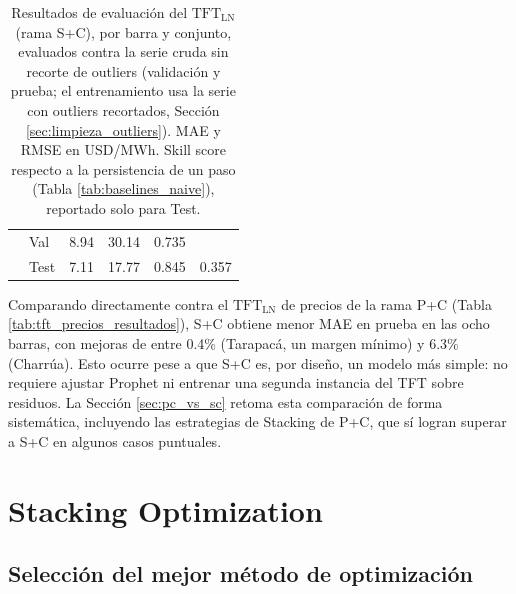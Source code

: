 \begin{table}[htbp]
\begin{tabular}{llrrrr}
            & Val   & 8.94 & 30.14 & 0.735 & \\
            & Test  & 7.11 & 17.77 & 0.845 & 0.357 \\
        \bottomrule
    \end{tabular}
    \vspace{0.2cm}
    \caption{Resultados de evaluación del $\text{TFT}_\text{LN}$ (rama S+C), por barra y conjunto, evaluados contra la serie cruda sin recorte de outliers (validación y prueba; el entrenamiento usa la serie con outliers recortados, Sección \ref{sec:limpieza_outliers}). MAE y RMSE en USD/MWh. Skill score respecto a la persistencia de un paso (Tabla \ref{tab:baselines_naive}), reportado solo para Test.}
    \label{tab:tft_sc_ln_resultados}
\end{table}

Comparando directamente contra el $\text{TFT}_\text{LN}$ de precios de la rama P+C (Tabla \ref{tab:tft_precios_resultados}), S+C obtiene menor MAE en prueba en las ocho barras, con mejoras de entre 0.4\% (Tarapacá, un margen mínimo) y 6.3\% (Charrúa). Esto ocurre pese a que S+C es, por diseño, un modelo más simple: no requiere ajustar Prophet ni entrenar una segunda instancia del TFT sobre residuos. La Sección \ref{sec:pc_vs_sc} retoma esta comparación de forma sistemática, incluyendo las estrategias de Stacking de P+C, que sí logran superar a S+C en algunos casos puntuales.

\section{Stacking Optimization}
\label{sec:stacking_resultados}

\subsection{Selección del mejor método de optimización}

